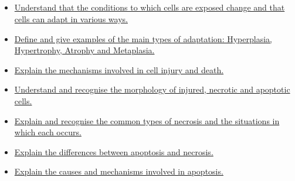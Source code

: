 \documentclass[10pt, a4paper]{article}
\newcommand{\MYhref}[3][blue]{\href{#2}{\color{#1}{#3}}}%
\begin{document}
\subsection{\MYhref[melbBlue]{https://notion.so/2ac544f1d7a0408f9f122e342d5ba0bf}{Cell Adaptation, Injury and Death}} \begin{itemize} \item \href{https://www.notion.so/4d662618de9045c0a0989d332b34d3a2}{Understand that the conditions to which cells are exposed change and that cells can adapt in various ways.} \item \href{https://www.notion.so/154dfd6470934c4bbab0e4eaea201a34}{Define and give examples of the main types of adaptation: Hyperplasia, Hypertrophy, Atrophy and Metaplasia.} \item \href{https://www.notion.so/a9a02843c0b54032b694038e16e90aaf}{Explain the mechanisms involved in cell injury and death.} \item \href{https://www.notion.so/4c56c546a37b48a297abbe00833f433c}{Understand and recognise the morphology of injured, necrotic and apoptotic cells.} \item \href{https://www.notion.so/0fa95f5d21034046a673540f9701f931}{Explain and recognise the common types of necrosis and the situations in which each occurs.} \item \href{https://www.notion.so/15f9d94368094a258a7e91b46e18a841}{Explain the differences between apoptosis and necrosis.} \item \href{https://www.notion.so/67da23fd9a4a45888fcedc836294788d}{Explain the causes and mechanisms involved in apoptosis.} \end{itemize}
\end{document}
